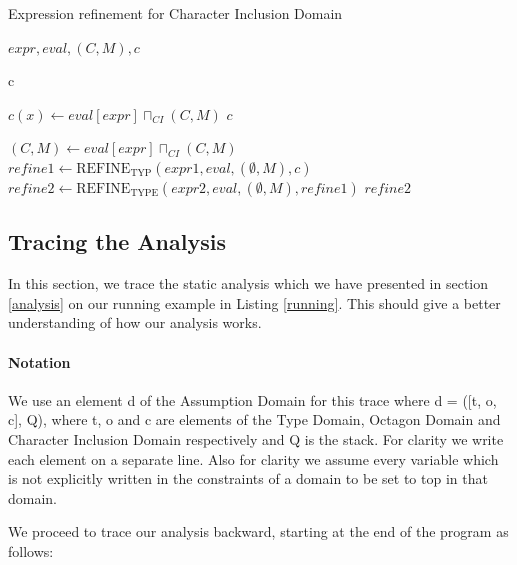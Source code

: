\documentclass[10pt]{report}
\begin{document}
\begin{algorithm}[H]
	\caption{Expression refinement for Character Inclusion Domain} \label{refineC}
	\begin{algorithmic}
		 {$ expr, eval, (C, M), c$}
		
		\State \Return c
		\EndIf
		
		\State $ c(x) \gets eval[expr] \sqcap_{CI} (C, M)$
		\State \Return $ c $
		\EndIf
		
		\State $ (C, M) \gets eval[expr] \sqcap_{CI} (C, M)  $
		\State $ refine1 \gets \mathrm{REFINE}_{\mathrm{TYP}}(expr1, eval, (\emptyset, M), c) $
		\State $ refine2 \gets \mathrm{REFINE}_{\mathrm{TYPE}}(expr2, eval, (\emptyset, M), refine1) $
		\State \Return $ refine2 $
		\EndIf
		
		\EndFunction
	\end{algorithmic}
\end{algorithm}

\subsection{Tracing the Analysis} \label{trace}
In this section, we trace the static analysis which we have presented in section \ref{analysis} on our running example in Listing \ref{running}. This should give a better understanding of how our analysis works. 

\paragraph{Notation}
We use an element d of the Assumption Domain for this trace where d = ([t, o, c], Q), where t, o and c are elements of the Type Domain, Octagon Domain and Character Inclusion Domain respectively and Q is the stack. For clarity we write each element on a separate line. Also for clarity we assume every variable which is not explicitly written in the constraints of a domain to be set to top in that domain. 

We proceed to trace our analysis backward, starting at the end of the program as follows: \\
\end{document}
